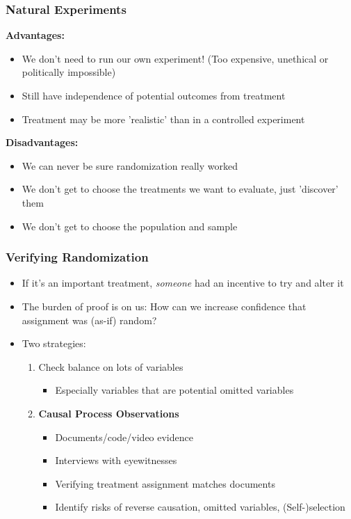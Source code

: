 \documentclass[xcolor=x11names,compress]{beamer}\usepackage[]{graphicx}\usepackage[]{color}
\renewcommand{\(}{\begin{columns}}
\renewcommand{\)}{\end{columns}}
\newcommand{\<}[1]{\begin{column}{#1}}
\renewcommand{\>}{\end{column}}
\begin{document}
\begin{frame}
\frametitle{Natural Experiments}
\begin{multicols}{2}
\textbf{Advantages:}
\begin{itemize}
\item We don't need to run our own experiment! (Too expensive, unethical or politically impossible)
\pause
\item Still have independence of potential outcomes from treatment
\pause
\item Treatment may be more 'realistic' than in a controlled experiment
\pause
\end{itemize}
\columnbreak
\textbf{Disadvantages:}
\begin{itemize}
\item We can never be sure randomization really worked
\pause
\item We don't get to choose the treatments we want to evaluate, just 'discover' them
\pause
\item We don't get to choose the population and sample
\end{itemize}
\end{multicols}
\end{frame}

\begin{frame}
\frametitle{Verifying Randomization}
\begin{itemize}
\item If it's an important treatment, \textit{someone} had an incentive to try and alter it
\pause
\item The burden of proof is on us: How can we increase confidence that assignment was (as-if) random?
\pause
\item Two strategies:
\pause
\begin{enumerate}
\item Check balance on lots of variables
\begin{itemize}
\item Especially variables that are potential omitted variables
\end{itemize}
\pause
\item \textbf{Causal Process Observations}
\pause
\begin{itemize}
\item Documents/code/video evidence
\pause
\item Interviews with eyewitnesses
\pause
\item Verifying treatment assignment matches documents
\pause
\item Identify risks of reverse causation, omitted variables, (Self-)selection
\end{itemize}
\end{enumerate}
\end{itemize}
\end{frame}
\end{document}
